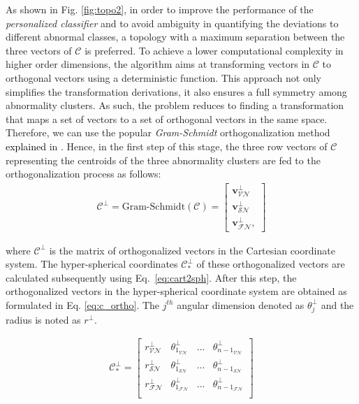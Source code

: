 As shown in Fig. \ref{fig:topo2}, in order to improve the performance of the \textit{personalized classifier} and to avoid ambiguity in quantifying the deviations to different abnormal classes, a topology with a maximum separation between the three vectors of $\mathcal{C}$ is preferred. To achieve a lower computational complexity in higher order dimensions, the algorithm aims at transforming vectors in $\mathcal{C}$ to orthogonal vectors using a deterministic function. This approach not only simplifies the transformation derivations, it also ensures a full symmetry among abnormality clusters. As such, the problem reduces to finding a transformation that maps a set of vectors to a set of orthogonal vectors in the same space. Therefore, we can use the popular \textit{Gram-Schmidt} orthogonalization method \textcolor{black}{explained} in \cite{Gram-schmidth1, Gram-schmidth2}. Hence, in the first step of this stage, the three row vectors of $\mathcal{C}$ representing the centroids of the three abnormality clusters are fed to the orthogonalization process as follows:
\begin{align}
\mathcal{C}^{\perp}= \text{Gram-Schmidt}(\mathcal{C})
=
\begin{bmatrix}
\mathbf{v}_{\mathcal{VN}}^{\perp} \\
\mathbf{v}_{\mathcal{SN}}^{\perp} \\
\mathbf{v}_{\mathcal{FN}}^{\perp},
\end{bmatrix}
\end{align}

where $\mathcal{C}^{\perp}$ is the matrix of orthogonalized vectors in the Cartesian coordinate system. The hyper-spherical coordinates $\mathcal{C}^{\perp}_{*}$ of these orthogonalized vectors are calculated subsequently using Eq.~\ref{eq:cart2sph}. After this step, the orthogonalized vectors in the hyper-spherical coordinate system are obtained as formulated in Eq. \ref{eq:c_ortho}. The $j^{th}$ angular dimension denoted as  $\theta_{j}^{\perp}$ and the radius is noted as $r^{\perp}$.%

\begin{align}
\label{eq:c_ortho}
\mathcal{C}^{\perp}_{*} =
\begin{bmatrix}
    r_{\mathcal{VN}}^{\perp} & \theta_{1_{\mathcal{VN}}}^{\perp} & \dots  & \theta_{{n-1}_{\mathcal{VN}}}^{\perp} \\
    r_{\mathcal{SN}}^{\perp} & \theta_{1_{\mathcal{SN}}}^{\perp} & \dots  & \theta_{{n-1}_{\mathcal{SN}}}^{\perp} \\
	r_{\mathcal{FN}}^{\perp} & \theta_{1_{\mathcal{FN}}}^{\perp} & \dots  & \theta_{{n-1}_{\mathcal{FN}}}^{\perp} \\
\end{bmatrix}
\end{align}


